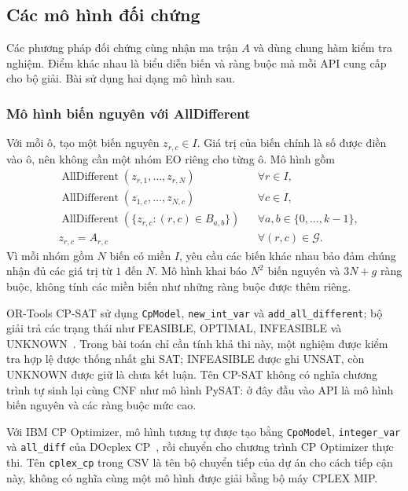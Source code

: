\documentclass[a4paper,fleqn]{cas-sc}
\begin{document}
\subsection{Các mô hình đối chứng}

Các phương pháp đối chứng cùng nhận ma trận $A$ và dùng chung hàm
kiểm tra nghiệm. Điểm khác nhau là biểu diễn biến và ràng buộc mà mỗi
API cung cấp cho bộ giải. Bài sử dụng hai dạng mô hình sau.

\subsubsection{Mô hình biến nguyên với AllDifferent}

Với mỗi ô, tạo một biến nguyên $z_{r,c}\in I$. Giá trị của biến chính
là số được điền vào ô, nên không cần một nhóm EO riêng cho từng ô.
Mô hình gồm
\begin{equation}
\begin{aligned}
 &\operatorname{AllDifferent}(z_{r,1},\ldots,z_{r,N})
    &&\forall r\in I,\\
 &\operatorname{AllDifferent}(z_{1,c},\ldots,z_{N,c})
    &&\forall c\in I,
 \\
 &\operatorname{AllDifferent}(\{z_{r,c}:(r,c)\in B_{a,b}\})
    &&\forall a,b\in\{0,\ldots,k-1\},\\
 &z_{r,c}=A_{r,c}
    &&\forall(r,c)\in\mathcal{G}.
\end{aligned}
\label{eq:method-cp-model}
\end{equation}
Vì mỗi nhóm gồm $N$ biến có miền $I$, yêu cầu các biến khác nhau bảo
đảm chúng nhận đủ các giá trị từ $1$ đến $N$.
Mô hình khai báo $N^2$ biến nguyên và $3N+g$ ràng buộc, không tính các
miền biến như những ràng buộc được thêm riêng.

OR-Tools CP-SAT sử dụng \texttt{CpModel}, \texttt{new\_int\_var} và
\texttt{add\_all\_different}; bộ giải trả các trạng thái như FEASIBLE,
OPTIMAL, INFEASIBLE và UNKNOWN~.
Trong bài toán chỉ cần tính khả thi này, một nghiệm được kiểm tra hợp
lệ được thống nhất ghi SAT; INFEASIBLE được ghi UNSAT, còn UNKNOWN
được giữ là chưa kết luận. Tên CP-SAT không có nghĩa chương trình tự
sinh lại cùng CNF như mô hình PySAT: ở đây đầu vào API là mô hình biến
nguyên và các ràng buộc mức cao.

Với IBM CP Optimizer, mô hình tương tự được tạo bằng
\texttt{CpoModel}, \texttt{integer\_var} và
\texttt{all\_diff} của DOcplex CP~, rồi chuyển cho
chương trình CP Optimizer thực thi. Tên \texttt{cplex\_cp} trong
CSV là tên bộ chuyển tiếp của dự án cho cách tiếp cận này, không có
nghĩa cùng một mô hình được giải bằng bộ máy CPLEX MIP.
\end{document}

